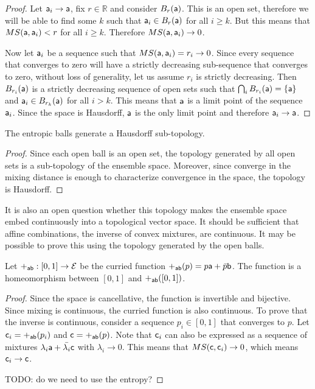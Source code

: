 \begin{proof}
	Let $\ens[a]_i \to \ens[a]$, fix $r \in \mathbb{R}$ and consider $B_r(\ens[a])$. This is an open set, therefore we will be able to find some $k$ such that $\ens[a]_i \in B_r(\ens[a])$ for all $i \geq k$. But this means that $MS(\ens[a], \ens[a]_i) < r$ for all $i \geq k$. Therefore $MS(\ens[a], \ens[a]_i) \to 0$.
	
	Now let $\ens[a]_i$ be a sequence such that $MS(\ens[a], \ens[a]_i) = r_i \to 0$. Since every sequence that converges to zero will have a strictly decreasing sub-sequence that converges to zero, without loss of generality, let us assume $r_i$ is strictly decreasing. Then $B_{r_i}(\ens[a])$ is a strictly decreasing sequence of open sets such that $\bigcap_i B_{r_i}(\ens[a]) = \{\ens[a]\}$ and $\ens[a]_i \in B_{r_k}(\ens[a])$ for all $i>k$. This means that $\ens[a]$ is a limit point of the sequence $\ens[a]_i$. Since the space is Hausdorff, $\ens[a]$ is the only limit point and therefore $\ens[a]_i \to \ens[a]$.
\end{proof}

\begin{prop}
	The entropic balls generate a Hausdorff sub-topology.
\end{prop}

\begin{proof}
	Since each open ball is an open set, the topology generated by all open sets is a sub-topology of the ensemble space. Moreover, since converge in the mixing distance is enough to characterize convergence in the space, the topology is Hausdorff.
\end{proof}

It is also an open question whether this topology makes the ensemble space embed continuously into a topological vector space. It should be sufficient that affine combinations, the inverse of convex mixtures, are continuous. It may be possible to prove this using the topology generated by the open balls.

\begin{conj}
	Let $+_{\ens[a]\ens[b]} : [0,1] \to \Ens$ be the curried function $+_{\ens[a]\ens[b]}(p) = p\ens[a] + \bar{p}\ens[b]$. The function is a homeomorphism between $[0,1]$ and $+_{\ens[a]\ens[b]}([0,1])$.
\end{conj}

\begin{proof}
	Since the space is cancellative, the function is invertible and bijective. Since mixing is continuous, the curried function is also continuous. To prove that the inverse is continuous, consider a sequence $p_i \in [0,1]$ that converges to $p$. Let $\ens[c]_i = +_{\ens[a]\ens[b]}(p_i)$ and $\ens[c] = +_{\ens[a]\ens[b]}(p)$. Note that $\ens[c]_i$ can also be expressed as a sequence of mixtures $\lambda_i \ens[a] + \bar{\lambda_i} \ens[c]$ with $\lambda_i \to 0$. This means that $MS(\ens[c], \ens[c]_i) \to 0$, which means $\ens[c]_i \to \ens[c]$.
	
	TODO: do we need to use the entropy?
\end{proof}

